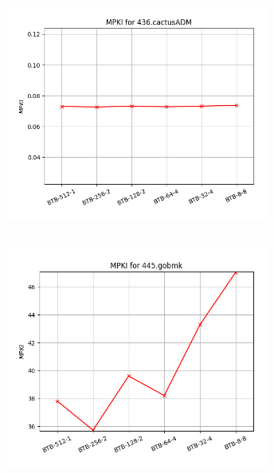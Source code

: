    \begin{minipage}{\textwidth}
      \begin{center}
         \\
         \vspace{3mm}
         \includegraphics[width=0.65\textwidth, frame]{./graphs/4-3/436-cactusADM.png}
         \vspace{6mm}
      \end{center}
   \end{minipage}

   \begin{minipage}{\textwidth}
      \begin{center}
         \\
         \vspace{3mm}
         \includegraphics[width=0.65\textwidth, frame]{./graphs/4-3/445-gobmk.png}
         \vspace{6mm}
      \end{center}
   \end{minipage}

